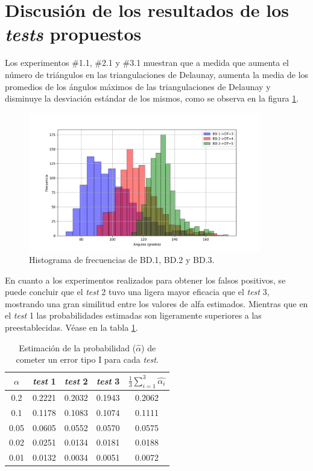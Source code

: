 \documentclass[12pt]{report}
\begin{document}
\section{Discusión de los resultados de los \textit{tests} propuestos}
Los experimentos \#1.1, \#2.1 y \#3.1 muestran que a medida que aumenta el número de triángulos en las triangulaciones de Delaunay, aumenta la media de los promedios de los ángulos máximos de las triangulaciones de Delaunay y disminuye la desviación estándar de los mismos, como se observa en la figura \ref{histograma}. 

			\begin{figure}[htbp]
	\centering
	\includegraphics[width=0.9\textwidth]{histograma.jpg}
	\caption{Histograma de frecuencias de BD.1, BD.2 y BD.3.}
	\label{histograma}
\end{figure}

En cuanto a los experimentos realizados para obtener los falsos positivos, se puede concluir que el \textit{test} 2 tuvo una ligera mayor eficacia que el \textit{test} 3, mostrando una gran similitud entre los valores de alfa estimados. Mientras que en el \textit{test} 1 las probabilidades estimadas son ligeramente superiores a las preestablecidas. Véase en la tabla \ref{tab:error1}.
\begin{table}[h!]
	\centering
	\caption{Estimación de la probabilidad ($\hat{\alpha}$) de cometer un error tipo I para cada \textit{test}.}
	\begin{tabular}{|c|ccc|c|}
		\hline
		$\alpha$& \textit{test} 1 & \textit{test} 2 & \textit{test} 3  & $\frac{1}{3} \sum_{i=1}^{3} \hat{\alpha_i}$  \\
		\hline
		0.2 &  0.2221    & 0.2032    &  0.1943 & 0.2062  \\
		0.1 &  0.1178    & 0.1083    &  0.1074 & 0.1111  \\
		0.05&  0.0605    & 0.0552    &  0.0570  & 0.0575  \\
		0.02&  0.0251    & 0.0134    &  0.0181 & 0.0188  \\
		0.01&  0.0132    & 0.0034    &  0.0051 & 0.0072  \\
		\hline
	\end{tabular}

	\label{tab:error1}
\end{table}
\end{document}
